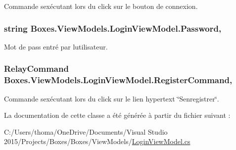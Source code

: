 Commande s\textquotesingle{}exécutant lors du click sur le bouton de connexion. 

\subsubsection[{\texorpdfstring{Password}{Password}}]{\setlength{\rightskip}{0pt plus 5cm}string Boxes.\+View\+Models.\+Login\+View\+Model.\+Password\hspace{0.3cm}{\ttfamily [get]}, {\ttfamily [set]}}\hypertarget{class_boxes_1_1_view_models_1_1_login_view_model_afe04bca22ce0658d9425ddbfda938132}{}\label{class_boxes_1_1_view_models_1_1_login_view_model_afe04bca22ce0658d9425ddbfda938132}


Mot de pass entré par l\textquotesingle{}utilisateur. 

\subsubsection[{\texorpdfstring{Register\+Command}{RegisterCommand}}]{\setlength{\rightskip}{0pt plus 5cm}Relay\+Command Boxes.\+View\+Models.\+Login\+View\+Model.\+Register\+Command\hspace{0.3cm}{\ttfamily [get]}, {}}\hypertarget{class_boxes_1_1_view_models_1_1_login_view_model_ac9703766c99fbb8a8ecfbac2a2e0dd06}{}\label{class_boxes_1_1_view_models_1_1_login_view_model_ac9703766c99fbb8a8ecfbac2a2e0dd06}


Commande s\textquotesingle{}exécutant lors du click sur le lien hypertext \char`\"{}\+S\textquotesingle{}enregistrer\char`\"{}. 



La documentation de cette classe a été générée à partir du fichier suivant \+:\begin{DoxyCompactItemize}
\item 
C\+:/\+Users/thoma/\+One\+Drive/\+Documents/\+Visual Studio 2015/\+Projects/\+Boxes/\+Boxes/\+View\+Models/\hyperlink{_login_view_model_8cs}{Login\+View\+Model.\+cs}\end{DoxyCompactItemize}
